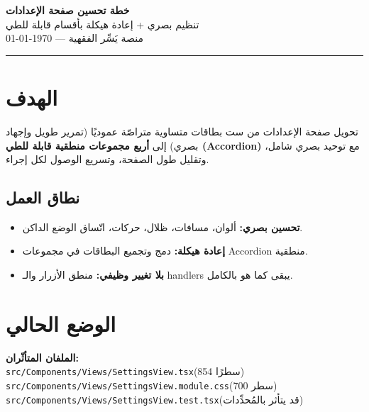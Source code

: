 \documentclass[11pt]{article}
\begin{document}
\begin{center}
  {\Huge\bfseries\color{gold} خطة تحسين صفحة الإعدادات}\\[4pt]
  {\large\color{darkbg} تنظيم بصري + إعادة هيكلة بأقسام قابلة للطي}\\[6pt]
  {\small\color{midgray} منصة يَسِّر الفقهية — \today}
\end{center}

\vspace{4pt}
\hrule
\vspace{10pt}

\section{الهدف}

\begin{goalbox}
تحويل صفحة الإعدادات من ست بطاقات متساوية متراصّة عموديًا (تمرير طويل وإجهاد بصري) إلى
\textbf{أربع مجموعات منطقية قابلة للطي (Accordion)} مع توحيد بصري شامل، وتقليل طول الصفحة،
وتسريع الوصول لكل إجراء.
\end{goalbox}

\subsection*{نطاق العمل}
\begin{itemize}
  \item \textbf{تحسين بصري:} ألوان، مسافات، ظلال، حركات، اتّساق الوضع الداكن.
  \item \textbf{إعادة هيكلة:} دمج وتجميع البطاقات في مجموعات Accordion منطقية.
  \item \textbf{بلا تغيير وظيفي:} منطق الأزرار والـ handlers يبقى كما هو بالكامل.
\end{itemize}

\section{الوضع الحالي}

\begin{notebox}
\textbf{الملفان المتأثّران:}\\[3pt]
\texttt{src/Components/Views/SettingsView.tsx}\quad(854 سطرًا)\\
\texttt{src/Components/Views/SettingsView.module.css}\quad(700 سطر)\\
\texttt{src/Components/Views/SettingsView.test.tsx}\quad(قد يتأثر بالمُحدِّدات)
\end{notebox}
\end{document}
